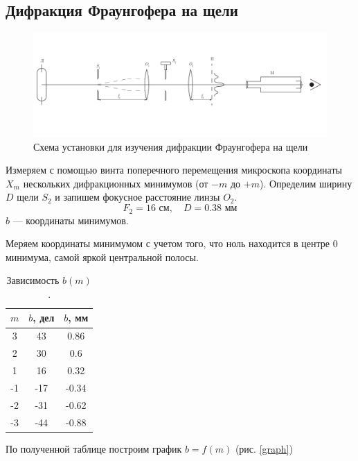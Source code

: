 \documentclass[a4paper, 12pt]{article}
\begin{document}
	\subsection{Дифракция Фраунгофера на щели}
	\begin{figure}[h]
		\centering
		\includegraphics[scale=0.55]{scheme2.pdf}
		\caption{Схема установки для изучения дифракции Фраунгофера на щели}
		\label{exp_scheme_2}
	\end{figure}
	Измеряем с помощью винта поперечного перемещения микроскопа координаты $X_m$ нескольких дифракционных минимумов (от $-m$ до $+m$). Определим ширину $D$ щели $S_2$ и запишем фокусное расстояние линзы $O_2$.
	\begin{equation*}
		F_2=16\text{ см}, \quad D=0.38\text{ мм}
	\end{equation*}
	$b$ — координаты минимумов.\par
	Меряем координаты минимумом с учетом того, что ноль находится в центре 0 минимума, самой яркой центральной полосы.\par
	\begin{table}[h]
		\centering
		\begin{tabular}{|c|c|c|}
			\hline
			$m$ & $b$, дел & $b$, мм\\
			\hline
			3 & 43 & 0.86\\
			2 & 30 & 0.6\\
			1 & 16 & 0.32\\
			-1 & -17 & -0.34\\
			-2 & -31 & -0.62\\
			-3 & -44 & -0.88\\
			\hline
		\end{tabular}
		\caption{Зависимость $b(m)$.}
	\end{table}
	По полученной таблице построим график $b=f(m)$ (рис. \ref{graph})
\end{document}
